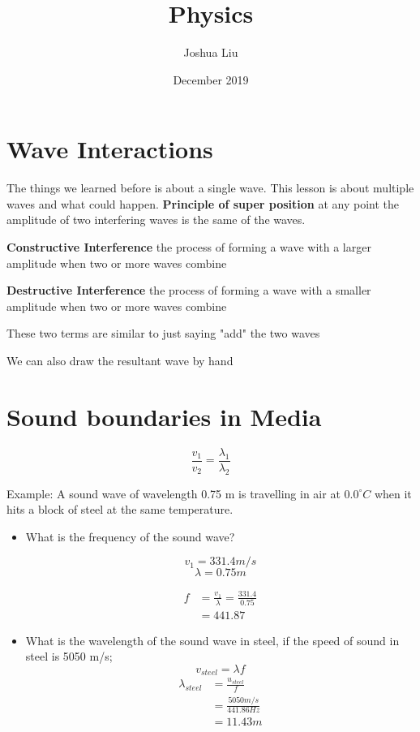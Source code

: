 \documentclass[10pt]{article}
\title{Physics}
\author{Joshua Liu}
\date{December 2019}
\begin{document}
\maketitle
\section{Wave Interactions}
The things we learned before is about a single wave. This lesson is about multiple waves
and what could happen.
\textbf{Principle of super position} at any point the amplitude of two interfering waves
is the same of the waves.

\textbf{Constructive Interference} the process of forming a wave with a larger
amplitude when two or more waves combine

\textbf{Destructive Interference} the process of forming a wave with a smaller amplitude when two or more waves combine

These two terms are similar to just saying "add" the two waves

We can also draw the resultant wave by hand

\section{Sound boundaries in Media}
$$\frac{v_1}{v_2}=\frac{\lambda_1}{\lambda_2}$$

Example:
A sound wave of wavelength 0.75 m is travelling in air at $0.0^{\circ}C$ when it
hits a block of steel at the same temperature. 
\begin{itemize}
    \item What is the frequency of the sound wave?
    
    $$v_1=331.4m/s$$
    $$\lambda=0.75m$$

    \begin{align*}
        f&=\frac{v_1}{\lambda}=\frac{331.4}{0.75}\\
        &=441.87
    \end{align*}
    \item What is the wavelength of the sound wave in steel, if the speed of sound in steel is 5050 m/s;
    $$v_{steel}=\lambda f$$
    \begin{align*}
        \lambda_{steel}&=\frac{u_{steel}}{f}\\
        &=\frac{5050m/s}{441.86Hz}\\
        &=11.43m
    \end{align*}
    
\end{itemize}
\end{document}
